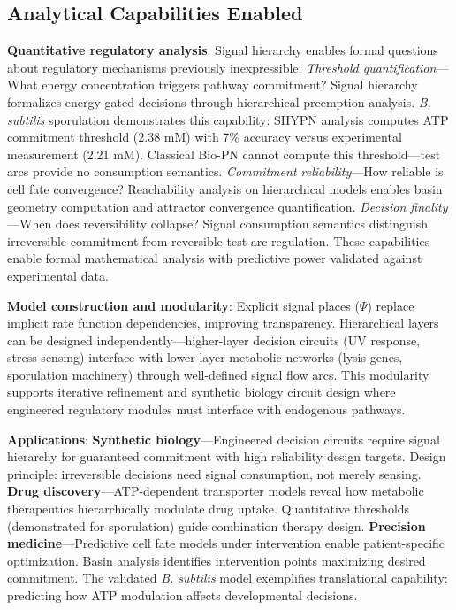 \subsection{Analytical Capabilities Enabled}

\vspace{3pt}
\noindent\textbf{Quantitative regulatory analysis}: Signal hierarchy enables formal questions about regulatory mechanisms previously inexpressible: \textit{Threshold quantification}---What energy concentration triggers pathway commitment? Signal hierarchy formalizes energy-gated decisions through hierarchical preemption analysis. \textit{B. subtilis} sporulation demonstrates this capability: SHYPN analysis computes ATP commitment threshold (2.38 mM) with 7\% accuracy versus experimental measurement (2.21 mM). Classical Bio-PN cannot compute this threshold---test arcs provide no consumption semantics. \textit{Commitment reliability}---How reliable is cell fate convergence? Reachability analysis on hierarchical models enables basin geometry computation and attractor convergence quantification. \textit{Decision finality}---When does reversibility collapse? Signal consumption semantics distinguish irreversible commitment from reversible test arc regulation. These capabilities enable formal mathematical analysis with predictive power validated against experimental data.

\vspace{3pt}
\noindent\textbf{Model construction and modularity}: Explicit signal places ($\Psi$) replace implicit rate function dependencies, improving transparency. Hierarchical layers can be designed independently---higher-layer decision circuits (UV response, stress sensing) interface with lower-layer metabolic networks (lysis genes, sporulation machinery) through well-defined signal flow arcs. This modularity supports iterative refinement and synthetic biology circuit design where engineered regulatory modules must interface with endogenous pathways.

\vspace{3pt}
\noindent\textbf{Applications}: \textbf{Synthetic biology}---Engineered decision circuits require signal hierarchy for guaranteed commitment with high reliability design targets. Design principle: irreversible decisions need signal consumption, not merely sensing. \textbf{Drug discovery}---ATP-dependent transporter models reveal how metabolic therapeutics hierarchically modulate drug uptake. Quantitative thresholds (demonstrated for sporulation) guide combination therapy design. \textbf{Precision medicine}---Predictive cell fate models under intervention enable patient-specific optimization. Basin analysis identifies intervention points maximizing desired commitment. The validated \textit{B. subtilis} model exemplifies translational capability: predicting how ATP modulation affects developmental decisions.

